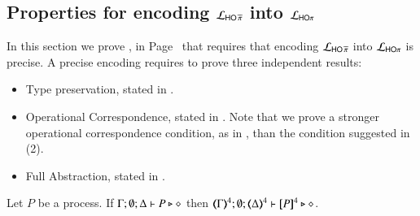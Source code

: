 


\subsection{Properties for encoding $\mathcal{L}_{\mathsf{HO}\,{\widetilde{\pi}}}$ into $\mathcal{L}_{\mathsf{HO}\pi}$}
\label{app:pHOp_to_HOp}



In this section we prove , in Page~\pageref{f:enc:phopiptohopi}
that requires that encoding
$\mathcal{L}_{\mathsf{HO}\,{\widetilde{\pi}}}$ into $\mathcal{L}_{\mathsf{HO}\pi}$ is precise.
A precise encoding requires to prove three independent results:
\begin{itemize}
	\item	Type preservation, stated in .
	\item	Operational Correspondence, stated in .
		Note that we prove a stronger operational correspondence condition,
		as in ,
		than the condition suggested in (2).
	\item	Full Abstraction, stated in .
\end{itemize}


\begin{proposition}\rm
	\label{app:prop:typepres_pHOp_to_HOp}
	Let $P$ be a \pHOp process.
	If $\Gamma; \emptyset; \Delta \vdash P \triangleright \diamond$ then 
	$\tmap{\Gamma}{4}; \emptyset; \tmap{\Delta}{4} \proves \pmap{P}{4} \hastype \Proc$. 
\end{proposition}

